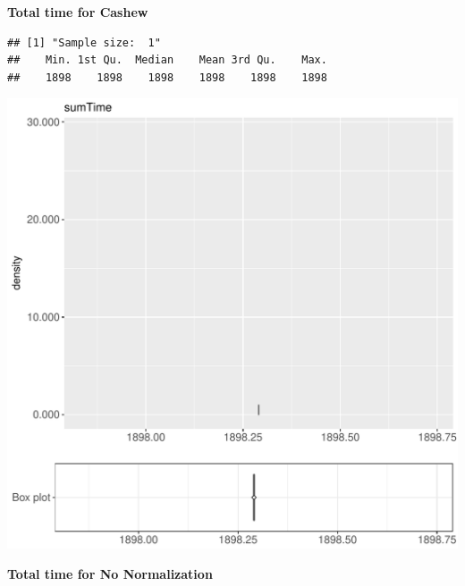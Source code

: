 \documentclass{article}\usepackage[]{graphicx}\usepackage[]{color}
\makeatletter
\def\maxwidth{ %
  \ifdim\Gin@nat@width>\linewidth
    \linewidth
  \else
    \Gin@nat@width
  \fi
}
\newenvironment{kframe}{%
 \def\at@end@of@kframe{}%
 \ifinner\ifhmode%
  \def\at@end@of@kframe{\end{minipage}}%
  \begin{minipage}{\columnwidth}%
 \fi\fi%
 \def\FrameCommand##1{\hskip\@totalleftmargin \hskip-\fboxsep
 \colorbox{shadecolor}{##1}\hskip-\fboxsep
     \hskip-\linewidth \hskip-\@totalleftmargin \hskip\columnwidth}%
 \MakeFramed {\advance\hsize-\width
   \@totalleftmargin\z@ \linewidth\hsize
   \@setminipage}}%
 {\par\unskip\endMakeFramed%
 \at@end@of@kframe}
\newenvironment{knitrout}{}{} %
\makeatother
\begin{document}
 \textbf{Total time for Cashew}
\begin{knitrout}
\color{fgcolor}\begin{kframe}
\begin{verbatim}
## [1] "Sample size:  1"
##    Min. 1st Qu.  Median    Mean 3rd Qu.    Max. 
##    1898    1898    1898    1898    1898    1898
\end{verbatim}


{\ttfamily\noindent\bfseries{}}\end{kframe}
\includegraphics[width=\maxwidth]{figure/RH2_cashew_password2-1} 

\end{knitrout}
 \textbf{Total time for No Normalization}
\end{document}
